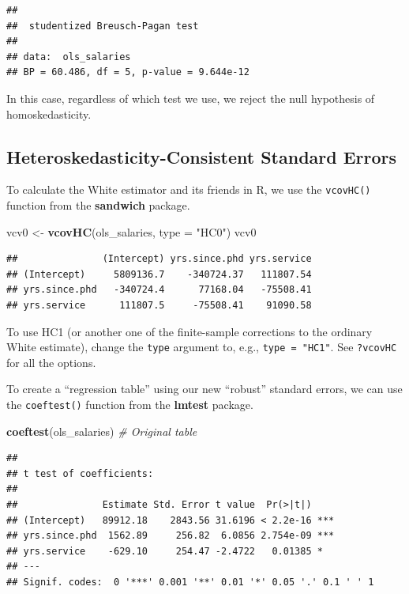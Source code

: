 \documentclass[
  12pt,
  oneside,openany]{book}
\newenvironment{Shaded}{\begin{snugshade}}{\end{snugshade}}
\newcommand{\CommentTok}[1]{\textcolor[rgb]{0.56,0.35,0.01}{\textit{#1}}}
\newcommand{\DataTypeTok}[1]{\textcolor[rgb]{0.13,0.29,0.53}{#1}}
\newcommand{\KeywordTok}[1]{\textcolor[rgb]{0.13,0.29,0.53}{\textbf{#1}}}
\newcommand{\NormalTok}[1]{#1}
\newcommand{\StringTok}[1]{\textcolor[rgb]{0.31,0.60,0.02}{#1}}
\begin{document}
\begin{verbatim}
## 
##  studentized Breusch-Pagan test
## 
## data:  ols_salaries
## BP = 60.486, df = 5, p-value = 9.644e-12
\end{verbatim}

In this case, regardless of which test we use, we reject the null hypothesis of homoskedasticity.

\hypertarget{heteroskedasticity-consistent-standard-errors}{%
\subsection{Heteroskedasticity-Consistent Standard Errors}\label{heteroskedasticity-consistent-standard-errors}}

To calculate the White estimator and its friends in R, we use the \texttt{vcovHC()} function from the \textbf{sandwich} package.

\begin{Shaded}
\begin{Highlighting}[]
\NormalTok{vcv0 \textless{}{-}}\StringTok{ }\KeywordTok{vcovHC}\NormalTok{(ols\_salaries, }\DataTypeTok{type =} \StringTok{"HC0"}\NormalTok{)}
\NormalTok{vcv0}
\end{Highlighting}
\end{Shaded}

\begin{verbatim}
##               (Intercept) yrs.since.phd yrs.service
## (Intercept)     5809136.7    -340724.37   111807.54
## yrs.since.phd   -340724.4      77168.04   -75508.41
## yrs.service      111807.5     -75508.41    91090.58
\end{verbatim}

To use HC1 (or another one of the finite-sample corrections to the ordinary White estimate), change the \texttt{type} argument to, e.g., \texttt{type\ =\ "HC1"}. See \texttt{?vcovHC} for all the options.

To create a ``regression table'' using our new ``robust'' standard errors, we can use the \texttt{coeftest()} function from the \textbf{lmtest} package.

\begin{Shaded}
\begin{Highlighting}[]
\KeywordTok{coeftest}\NormalTok{(ols\_salaries)  }\CommentTok{\# Original table}
\end{Highlighting}
\end{Shaded}

\begin{verbatim}
## 
## t test of coefficients:
## 
##               Estimate Std. Error t value  Pr(>|t|)    
## (Intercept)   89912.18    2843.56 31.6196 < 2.2e-16 ***
## yrs.since.phd  1562.89     256.82  6.0856 2.754e-09 ***
## yrs.service    -629.10     254.47 -2.4722   0.01385 *  
## ---
## Signif. codes:  0 '***' 0.001 '**' 0.01 '*' 0.05 '.' 0.1 ' ' 1
\end{verbatim}
\end{document}
